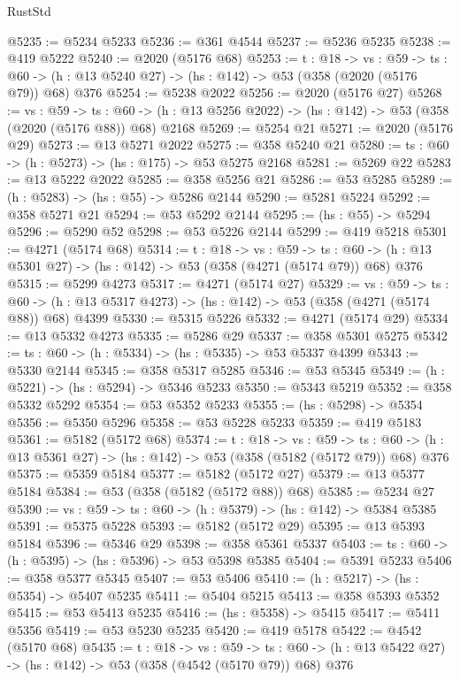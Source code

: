\begin{lexlean}{RustStd}
\begin{coremodule}
@5235 := @5234 @5233
@5236 := @361 @4544
@5237 := @5236 @5235
@5238 := @419 @5222
@5240 := @2020 (@5176 @68)
@5253 := {t : @18} ->
  {vs : @59} ->
  {ts : @60} -> (h : @13 @5240 @27) -> (hs : @142) -> @53 (@358 (@2020 (@5176 @79)) @68) @376
@5254 := @5238 @2022
@5256 := @2020 (@5176 @27)
@5268 := {vs : @59} ->
  {ts : @60} -> (h : @13 @5256 @2022) -> (hs : @142) -> @53 (@358 (@2020 (@5176 @88)) @68) @2168
@5269 := @5254 @21
@5271 := @2020 (@5176 @29)
@5273 := @13 @5271 @2022
@5275 := @358 @5240 @21
@5280 := {ts : @60} -> (h : @5273) -> (hs : @175) -> @53 @5275 @2168
@5281 := @5269 @22
@5283 := @13 @5222 @2022
@5285 := @358 @5256 @21
@5286 := @53 @5285
@5289 := (h : @5283) -> (hs : @55) -> @5286 @2144
@5290 := @5281 @5224
@5292 := @358 @5271 @21
@5294 := @53 @5292 @2144
@5295 := (hs : @55) -> @5294
@5296 := @5290 @52
@5298 := @53 @5226 @2144
@5299 := @419 @5218
@5301 := @4271 (@5174 @68)
@5314 := {t : @18} ->
  {vs : @59} ->
  {ts : @60} -> (h : @13 @5301 @27) -> (hs : @142) -> @53 (@358 (@4271 (@5174 @79)) @68) @376
@5315 := @5299 @4273
@5317 := @4271 (@5174 @27)
@5329 := {vs : @59} ->
  {ts : @60} -> (h : @13 @5317 @4273) -> (hs : @142) -> @53 (@358 (@4271 (@5174 @88)) @68) @4399
@5330 := @5315 @5226
@5332 := @4271 (@5174 @29)
@5334 := @13 @5332 @4273
@5335 := @5286 @29
@5337 := @358 @5301 @5275
@5342 := {ts : @60} -> (h : @5334) -> (hs : @5335) -> @53 @5337 @4399
@5343 := @5330 @2144
@5345 := @358 @5317 @5285
@5346 := @53 @5345
@5349 := (h : @5221) -> (hs : @5294) -> @5346 @5233
@5350 := @5343 @5219
@5352 := @358 @5332 @5292
@5354 := @53 @5352 @5233
@5355 := (hs : @5298) -> @5354
@5356 := @5350 @5296
@5358 := @53 @5228 @5233
@5359 := @419 @5183
@5361 := @5182 (@5172 @68)
@5374 := {t : @18} ->
  {vs : @59} ->
  {ts : @60} -> (h : @13 @5361 @27) -> (hs : @142) -> @53 (@358 (@5182 (@5172 @79)) @68) @376
@5375 := @5359 @5184
@5377 := @5182 (@5172 @27)
@5379 := @13 @5377 @5184
@5384 := @53 (@358 (@5182 (@5172 @88)) @68)
@5385 := @5234 @27
@5390 := {vs : @59} -> {ts : @60} -> (h : @5379) -> (hs : @142) -> @5384 @5385
@5391 := @5375 @5228
@5393 := @5182 (@5172 @29)
@5395 := @13 @5393 @5184
@5396 := @5346 @29
@5398 := @358 @5361 @5337
@5403 := {ts : @60} -> (h : @5395) -> (hs : @5396) -> @53 @5398 @5385
@5404 := @5391 @5233
@5406 := @358 @5377 @5345
@5407 := @53 @5406
@5410 := (h : @5217) -> (hs : @5354) -> @5407 @5235
@5411 := @5404 @5215
@5413 := @358 @5393 @5352
@5415 := @53 @5413 @5235
@5416 := (hs : @5358) -> @5415
@5417 := @5411 @5356
@5419 := @53 @5230 @5235
@5420 := @419 @5178
@5422 := @4542 (@5170 @68)
@5435 := {t : @18} ->
  {vs : @59} ->
  {ts : @60} -> (h : @13 @5422 @27) -> (hs : @142) -> @53 (@358 (@4542 (@5170 @79)) @68) @376

\end{coremodule}
\end{lexlean}
